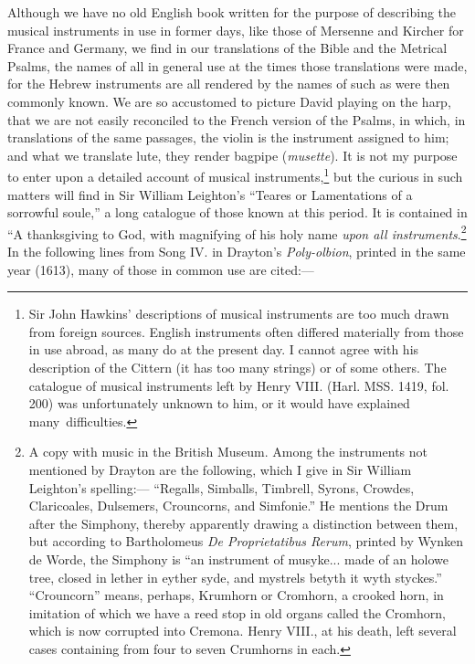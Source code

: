 Although we have no old English book written for the purpose of describing the
musical instruments in use in former days, like those of Mersenne and Kircher
for France and Germany, we find in our translations of the Bible and the
Metrical Psalms, the names of all in general use at the times those translations
were made, for the Hebrew instruments are all rendered by the names of such as
were then commonly known. We are so accustomed to picture David playing
on the harp, that we are not easily reconciled to the French version of the
Psalms, in which, in translations of the same passages, the violin is the instrument
assigned to him; and what we translate lute, they render bagpipe (\textit{musette}).
It is not my purpose to enter upon a detailed account of musical instruments,\footnote{\textit{}
Sir John Hawkins’ descriptions of musical instruments
are too much drawn from foreign sources. English
instruments often differed materially from those in use
abroad, as many do at the present day. I cannot agree
with his description of the Cittern (it has too many strings)
or of some others. The catalogue of musical instruments
left by Henry VIII. (Harl. MSS. 1419, fol. 200)
was unfortunately unknown to him, or it would have
explained many~difficulties.}
but the curious in such matters will find in Sir William Leighton’s “Teares or
Lamentations of a sorrowful soule,” a long catalogue of those known at this period.
It is contained in “A thanksgiving to God, with magnifying of his holy name \textit{upon
all instruments}.\footnote{\textit{}
A copy with music in the British Museum. Among
the instruments not mentioned by Drayton are the following, 
which I give in Sir William Leighton’s spelling:—
“Regalls, Simballs, Timbrell, Syrons, Crowdes, Claricoales, 
Dulsemers, Crouncorns, and Simfonie.” He mentions
the Drum after the Simphony, thereby apparently
drawing a distinction between them, but according to
Bartholomeus \textit{De Proprietatibus Rerum}, printed by
Wynken de Worde, the Simphony is “an instrument
of musyke... made of an holowe tree, closed in lether
in eyther syde, and mystrels betyth it wyth styckes.”
“Crouncorn” means, perhaps, Krumhorn or Cromhorn, a
crooked horn, in imitation of which we have a reed stop in
old organs called the Cromhorn, which is now corrupted
into Cremona. Henry VIII., at his death, left several
cases containing from four to seven Crumhorns in each.}
In the following lines from Song IV. in Drayton’s \textit{Poly-olbion},
printed in the same year (1613), many of those in common use are cited:—
\pagebreak

